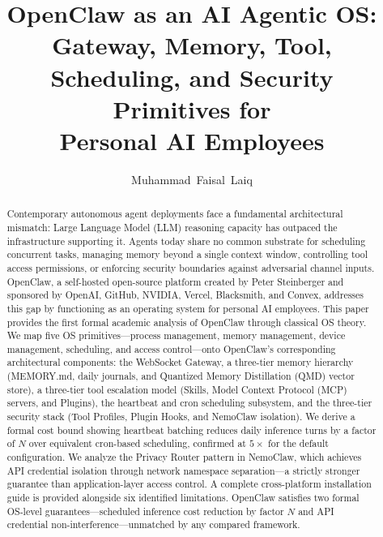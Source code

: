 \documentclass[journal]{IEEEtran}
\begin{document}
\title{OpenClaw as an AI Agentic OS: Gateway, Memory, Tool,\\
Scheduling, and Security Primitives for\\
Personal AI Employees}

\author{Muhammad~Faisal~Laiq%
}%

\maketitle

\begin{abstract}
Contemporary autonomous agent deployments face a fundamental architectural
mismatch: Large Language Model (LLM) reasoning capacity has outpaced the infrastructure supporting
it. Agents today share no common substrate for scheduling concurrent tasks,
managing memory beyond a single context window, controlling tool access
permissions, or enforcing security boundaries against adversarial channel
inputs. OpenClaw, a self-hosted open-source platform created by Peter
Steinberger and sponsored by OpenAI, GitHub, NVIDIA, Vercel, Blacksmith, and
Convex, addresses this gap by functioning as an operating system for personal
AI employees. This paper provides the first formal academic analysis of
OpenClaw through classical OS theory. We map five OS primitives---process
management, memory management, device management, scheduling, and access
control---onto OpenClaw's corresponding architectural components: the
WebSocket Gateway, a three-tier memory hierarchy (MEMORY.md, daily journals,
and Quantized Memory Distillation (QMD) vector store), a three-tier tool
escalation model (Skills, Model Context Protocol (MCP) servers, and Plugins), the heartbeat and cron
scheduling subsystem, and the three-tier security stack (Tool Profiles,
Plugin Hooks, and NemoClaw isolation). We derive a formal cost bound showing
heartbeat batching reduces daily inference turns by a factor of $N$ over
equivalent cron-based scheduling, confirmed at $5\times$ for the default
configuration. We analyze the Privacy Router pattern in NemoClaw, which
achieves API credential isolation through network namespace separation---a
strictly stronger guarantee than application-layer access control. A complete cross-platform installation guide is provided alongside six identified limitations. OpenClaw satisfies two formal OS-level guarantees---scheduled inference
cost reduction by factor $N$ and API credential non-interference---unmatched
by any compared framework.
\end{abstract}
\end{document}
